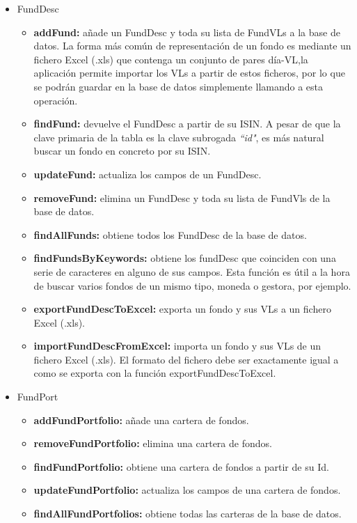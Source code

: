 \documentclass[12pt, a4paper]{book}
\begin{document}
\begin{itemize}
	\item FundDesc
						 \begin{itemize}
							\item \textbf{addFund:} añade un FundDesc y toda su lista de FundVLs a la base de datos. La forma más común de representación de un fondo es mediante un fichero Excel (.xls) que contenga un conjunto de pares día-\gls{VL},la aplicación permite importar los \gls{VL}s a partir de estos ficheros, por lo que se podrán guardar en la base de datos simplemente llamando a esta operación.
							\item \textbf{findFund:} devuelve el FundDesc a partir de su \gls{ISIN}. A pesar de que la clave primaria de la tabla es la clave subrogada \textit{``id"}, es más natural buscar un fondo en concreto por su \gls{ISIN}.
							\item \textbf{updateFund:} actualiza los campos de un FundDesc.
							\item \textbf{removeFund:} elimina un FundDesc y toda su lista de FundVls de la base de datos.
							\item \textbf{findAllFunds:} obtiene todos los FundDesc de la base de datos.
							\item \textbf{findFundsByKeywords:} obtiene los fundDesc que coinciden con una serie de caracteres en alguno de sus campos. Esta función es útil a la hora de buscar varios fondos de un mismo tipo, moneda o gestora, por ejemplo.
							\item \textbf{exportFundDescToExcel: }exporta un fondo y sus \gls{VL}s a un fichero Excel (.xls).
							\item \textbf{importFundDescFromExcel: }importa un fondo y sus \gls{VL}s de un fichero Excel (.xls). El formato del fichero debe ser exactamente igual a como se exporta con la función exportFundDescToExcel.
				 		 \end{itemize}
	\item FundPort
						\begin{itemize}
							\item \textbf{addFundPortfolio:} añade una cartera de fondos.
							\item \textbf{removeFundPortfolio:} elimina una cartera de fondos.
							\item \textbf{findFundPortfolio:} obtiene una cartera de fondos a partir de su Id.
							\item \textbf{updateFundPortfolio:} actualiza los campos de una cartera de fondos.
							\item \textbf{findAllFundPortfolios:} obtiene todas las carteras de la base de datos.

\end{itemize}
\end{itemize}
\end{document}
